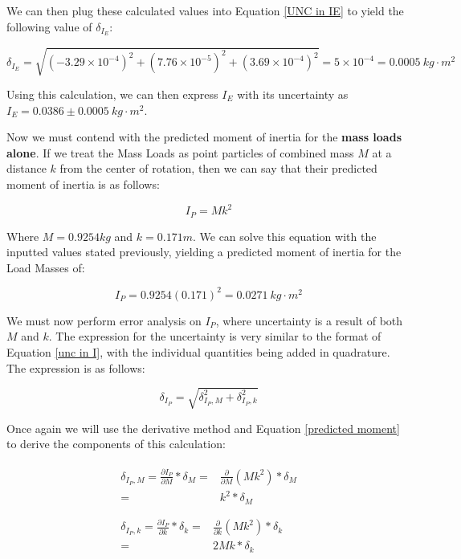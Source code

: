 \documentclass[12pt]{article}
\begin{document}
\indent We can then plug these calculated values into Equation \ref{UNC in IE} to yield the following value of $\delta_{I_E}$:

\begin{equation*}
    \delta_{I_E}=\sqrt{(-3.29\times10^{-4})^2+(7.76\times10^{-5})^2+(3.69\times10^{-4})^2}=5\times10^{-4}=0.0005\ kg\cdot m^2
\end{equation*}

\indent Using this calculation, we can then express $I_E$ with its uncertainty as $I_E=0.0386\pm0.0005\ kg\cdot m^2$. \par

Now we must contend with the predicted moment of inertia for the \textbf{mass loads alone}. If we treat the Mass Loads as point particles of combined mass $M$ at a distance $k$ from the center of rotation, then we can say that their predicted moment of inertia is as follows:

\begin{equation}
    I_P = Mk^2 \label{predicted moment}
\end{equation}

\noindent Where $M=0.9254kg$ and $k=0.171m$. We can solve this equation with the inputted values stated previously, yielding a predicted moment of inertia for the Load Masses of:

\begin{equation*}
    I_P=0.9254(0.171)^2=0.0271\ kg\cdot m^2
\end{equation*}

We must now perform error analysis on $I_P$, where uncertainty is a result of both $M$ and $k$. The expression for the uncertainty is very similar to the format of Equation \ref{unc in I}, with the individual quantities being added in quadrature. The expression is as follows:

\begin{equation}
    \delta_{I_P}=\sqrt{\delta^2_{I_P,M}+\delta^2_{I_P,k}} \label{UNC in p}
\end{equation}

\indent Once again we will use the derivative method and Equation \ref{predicted moment} to derive the components of this calculation:

\begin{align}
    \begin{split}
        \delta_{I_P,M}=\frac{\partial I_P}{\partial M} * \delta_M=&\frac{\partial}{\partial M}(Mk^2)*\delta_M \\
        =&k^2*\delta_M \label{IP due M}
    \end{split} \\ \nonumber \\
    \begin{split}
        \delta_{I_P,k}=\frac{\partial I_P}{\partial k}*\delta_k=&\frac{\partial}{\partial k}(Mk^2)*\delta_k \\
        =&2Mk*\delta_k \label{IP due k}
    \end{split}
\end{align}
\end{document}

